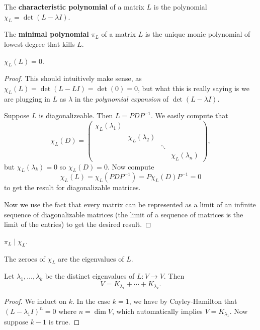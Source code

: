 \begin{df}
The \textbf{characteristic polynomial} of a matrix $L$ is the polynomial
$\chi_L = \det(L - \lambda I)$.
\end{df}

\begin{df}
The \textbf{minimal polynomial} $\pi_L$ of a matrix $L$ is the unique
monic polynomial of lowest degree that kills $L$.
\end{df}

\begin{thm}
$\chi_L(L) = 0$.
\end{thm}

\begin{proof}
This should intuitively make sense, as $\chi_L(L) = \det(L - LI) =
\det(0) = 0$, but what this is really saying is we are plugging in $L$
as $\lambda$ in the \emph{polynomial expansion} of $\det(L - \lambda
I)$.

Suppose $L$ is diagonalizeable. Then $L = PDP^{-1}$. We easily compute
that
\[ \chi_L(D) = \begin{pmatrix}
\chi_L(\lambda_1) & & \\
& \chi_L(\lambda_2) & & \\
& & \ddots & \\
& & & \chi_L(\lambda_n)
\end{pmatrix}, \]
but $\chi_L(\lambda_k) = 0$ so $\chi_L(D) = 0$. Now compute
\[ \chi_L(L) = \chi_L(PDP^{-1}) = P\chi_L(D)P^{-1} = 0 \]
to get the result for diagonalizable matrices.

Now we use the fact that every matrix can be represented as a limit of
an infinite sequence of diagonalizable matrices (the limit of a sequence
of matrices is the limit of the entries) to get the desired result.
\end{proof}

\begin{cor}
$\pi_L \mid \chi_L$.
\end{cor}

\begin{prop}
The zeroes of $\chi_L$ are the eigenvalues of $L$.
\end{prop}

\begin{lem}
Let $\lambda_1, \dots, \lambda_k$ be the distinct eigenvalues of $L : V
\rightarrow V$. Then
\[ V = K_{\lambda_1} + \cdots + K_{\lambda_k}. \]
\end{lem}

\begin{proof}
We induct on $k$. In the case $k = 1$, we have by Cayley-Hamilton that
$(L - \lambda_1 I)^n = 0$ where $n = \dim V$, which automatically
implies $V = K_{\lambda_1}$. Now suppose $k - 1$ is true.
\end{proof}
